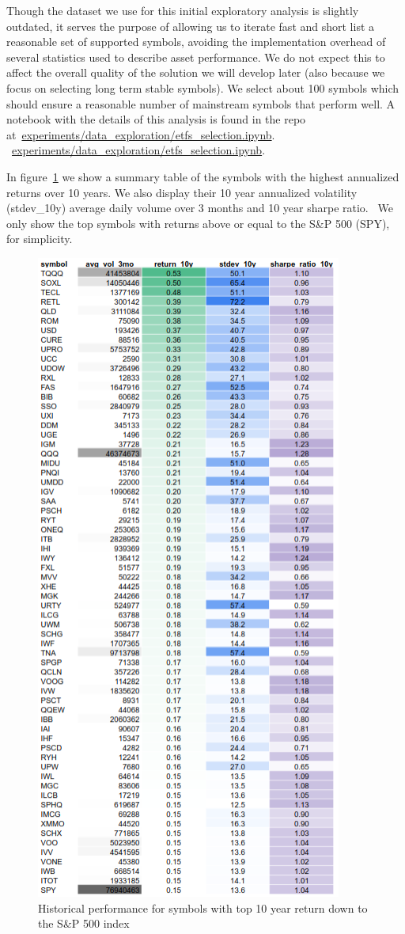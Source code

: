 \documentclass[10pt]{article}
\begin{document}
Though the dataset we use for this initial exploratory analysis is
slightly outdated, it serves the purpose of allowing us to iterate fast
and short list a reasonable set of supported symbols, avoiding the
implementation overhead of several statistics used to describe asset
performance. We do not expect this to affect the overall quality of the
solution we will develop later (also because we focus on selecting long
term stable symbols). We select about 100 symbols which should ensure a
reasonable number of mainstream symbols that perform well. A notebook
with the details of this analysis is found in the repo
at~\href{https://github.com/marcoopsampaio/aws_ml_eng_project_stock_prediction/blob/main/experiments/data_exploration/etfs_selection.ipynb}{experiments/data\_exploration/etfs\_selection.ipynb}.~
~\href{https://github.com/marcoopsampaio/aws_ml_eng_project_stock_prediction/blob/main/experiments/data_exploration/etfs_selection.ipynb}{experiments/data\_exploration/etfs\_selection.ipynb}.~

In figure~{\ref{488391}} we show a summary table of the
symbols with the highest annualized returns over 10 years. We also
display their 10 year annualized volatility (stdev\_10y) average daily
volume over 3 months and 10 year sharpe ratio.~ We only show the top
symbols with returns above or equal to the S\&P 500 (SPY), for
simplicity.
\begin{figure}[H]
\begin{center}
\includegraphics[width=0.56\columnwidth]{figures/screenshot/screenshot}
\caption{{Historical performance for symbols with top 10 year return down to the
S\&P 500 index~
{\label{488391}}%
}}
\end{center}
\end{figure}
\end{document}
